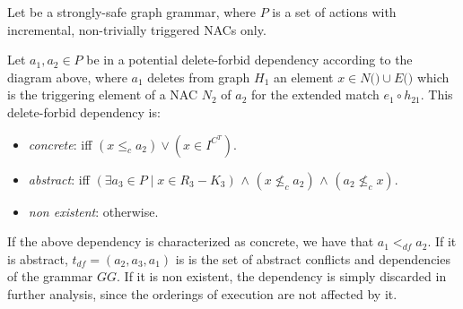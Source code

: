 \begin{definition}\label{def:delete-forbid-strong} Let \doublyTypedGraphGrammarCore{} be a strongly-safe graph grammar, where $P$ is a set of actions with incremental, non-trivially triggered NACs only.

\hfill

  Let $a_1, a_2 \in P$ be in a potential delete-forbid dependency according to the diagram above, where $a_1$ deletes from graph $H_1$ an element $x \in N($\coreGraph$) \cup E($\coreGraph$)$ which is the triggering element of a NAC $N_2$ of $a_2$ for the extended match $e_1 \circ h_{21}$. This delete-forbid dependency is:

\begin{itemize}
  \item \emph{concrete}: iff $(x \leq_c a_2) \lor (x \in I^{C^T})$.%
  \item \emph{abstract}: iff $(\exists a_3 \in P \mid x \in R_3 - K_3)$ $\land$ $(x \not\leq_c a_2)$ $\land$ $(a_2 \not\leq_c x)$.%
  \item \emph{non existent}: otherwise.
\end{itemize}

  If the above dependency is characterized as concrete, we have that \mbox{$a_1 <_{df} a_2$}. If it is abstract, $t_{df} = (a_2, a_3, a_1)$ is is the set of abstract conflicts and dependencies of the grammar $GG$. If it is non existent, the dependency is simply discarded in further analysis, since the orderings of execution are not affected by it.

\end{definition}

